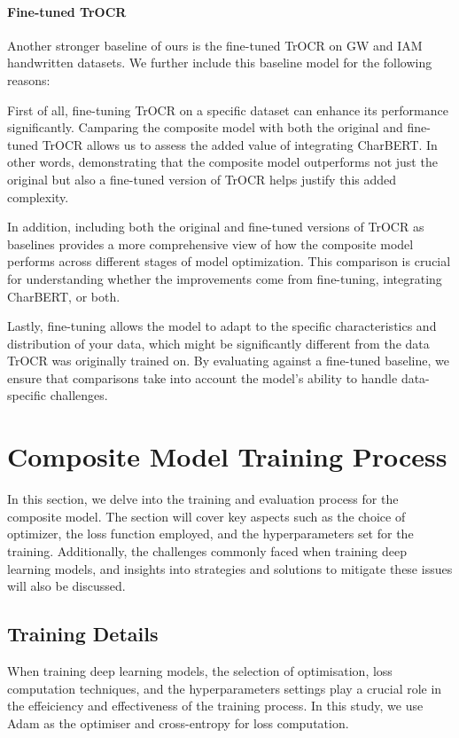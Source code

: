 \paragraph*{Fine-tuned TrOCR}
\label{par:4_fine_tuned_trocr}
Another stronger baseline of ours is the fine-tuned TrOCR on GW and IAM handwritten datasets. We further include this baseline model for the following reasons: 

First of all, fine-tuning TrOCR on a specific dataset can enhance its performance significantly. Camparing the composite model with both the original and fine-tuned TrOCR allows us to assess the added value of integrating CharBERT. In other words, demonstrating that the composite model outperforms not just the original but also a fine-tuned version of TrOCR helps justify this added complexity. 

In addition, including both the original and fine-tuned versions of TrOCR as baselines provides a more comprehensive view of how the composite model performs across different stages of model optimization. This comparison is crucial for understanding whether the improvements come from fine-tuning, integrating CharBERT, or both. 

Lastly, fine-tuning allows the model to adapt to the specific characteristics and distribution of your data, which might be significantly different from the data TrOCR was originally trained on. By evaluating against a fine-tuned baseline, we ensure that comparisons take into account the model's ability to handle data-specific challenges.
\section{Composite Model Training Process}
\label{sec:4_model_training_process}
In this section, we delve into the training and evaluation process for the composite model. The section will cover key aspects such as the choice of optimizer, the loss function employed, and the hyperparameters set for the training. Additionally, the challenges commonly faced when training deep learning models, and insights into strategies and solutions to mitigate these issues will also be discussed.
\subsection{Training Details}
\label{subsec:4_training_details}
When training deep learning models, the selection of optimisation, loss computation techniques, and the hyperparameters settings play a crucial role in the effeiciency and effectiveness of the training process. In this study, we use Adam as the optimiser and cross-entropy for loss computation.

